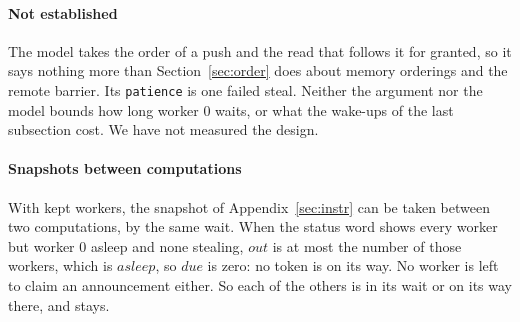 \documentclass[sigplan,nonacm]{acmart}
\begin{document}
\paragraph{Not established}
%
The model takes the order of a push and the read that follows it for
granted, so it says nothing more than Section~\ref{sec:order} does
about memory orderings and the remote barrier.
%
Its \lstinline|patience| is one failed steal.
%
Neither the argument nor the model bounds how long worker 0 waits, or
what the wake-ups of the last subsection cost.
%
We have not measured the design.

\paragraph{Snapshots between computations}
%
With kept workers, the snapshot of Appendix~\ref{sec:instr} can be
taken between two computations, by the same wait.
%
When the status word shows every worker but worker 0 asleep and none
stealing, $\mathit{out}$ is at most the number of those workers, which
is $\mathit{asleep}$, so $\mathit{due}$ is zero: no token is on its
way.
%
No worker is left to claim an announcement either.
%
So each of the others is in its wait or on its way there, and stays.
\end{document}
